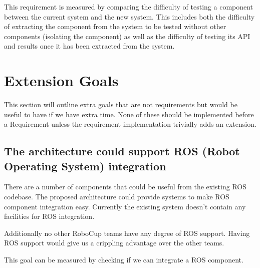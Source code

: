\documentclass[english,12pt]{scrartcl}
\begin{document}
            This requirement is measured by comparing the difficulty of testing a component between
            the current system and the new system. This includes both the difficulty of extracting
            the component from the system to be tested without other components (isolating the
            component) as well as the difficulty of testing its API and results once it has been
            extracted from the system. 
        
    \section{Extension Goals}
        This section will outline extra goals that are not requirements but would be useful to have
        if we have extra time. None of these should be implemented before a Requirement unless the
        requirement implementation trivially adds an extension.
        
        \subsection{The architecture could support ROS (Robot Operating System) integration}
            There are a number of components that could be useful from the existing ROS codebase.
            The proposed architecture could provide systems to make ROS component integration easy.
            Currently the existing system doesn't contain any facilities for ROS integration.
            
            Additionally no other RoboCup teams have any degree of ROS support. Having ROS support
            would give us a crippling advantage over the other teams. 
            
            This goal can be measured by checking if we can integrate a ROS component.
            
\end{document}
